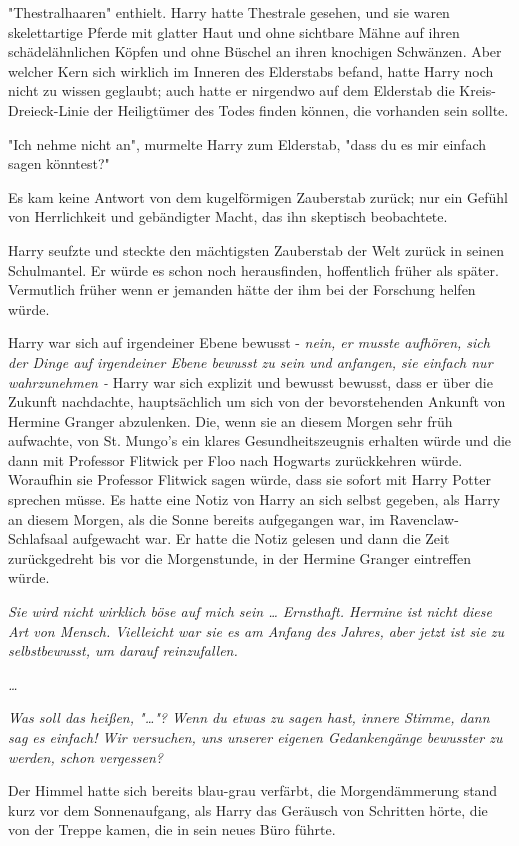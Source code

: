 {"Thestralhaaren" enthielt. Harry hatte Thestrale gesehen, und sie waren skelettartige Pferde mit glatter Haut und ohne sichtbare Mähne auf ihren schädelähnlichen Köpfen und ohne Büschel an ihren knochigen Schwänzen. Aber welcher Kern sich wirklich im Inneren des Elderstabs befand, hatte Harry noch nicht zu wissen geglaubt; auch hatte er nirgendwo auf dem Elderstab die Kreis-Dreieck-Linie der Heiligtümer des Todes finden können, die vorhanden sein sollte.

"Ich nehme nicht an", murmelte Harry zum Elderstab, "dass du es mir einfach sagen könntest?"

Es kam keine Antwort von dem kugelförmigen Zauberstab zurück; nur ein Gefühl von Herrlichkeit und gebändigter Macht, das ihn skeptisch beobachtete.

Harry seufzte und steckte den mächtigsten Zauberstab der Welt zurück in seinen Schulmantel. Er würde es schon noch herausfinden, hoffentlich früher als später. Vermutlich früher wenn er jemanden hätte der ihm bei der Forschung helfen würde.

Harry war sich auf irgendeiner Ebene bewusst - \emph{nein, er musste aufhören, sich der Dinge auf irgendeiner Ebene bewusst zu sein und anfangen, sie einfach nur wahrzunehmen -} Harry war sich explizit und bewusst bewusst, dass er über die Zukunft nachdachte, hauptsächlich um sich von der bevorstehenden Ankunft von Hermine Granger abzulenken. Die, wenn sie an diesem Morgen sehr früh aufwachte, von St. Mungo's ein klares Gesundheitszeugnis erhalten würde und die dann mit Professor Flitwick per Floo nach Hogwarts zurückkehren würde. Woraufhin sie Professor Flitwick sagen würde, dass sie sofort mit Harry Potter sprechen müsse. Es hatte eine Notiz von Harry an sich selbst gegeben, als Harry an diesem Morgen, als die Sonne bereits aufgegangen war, im Ravenclaw-Schlafsaal aufgewacht war. Er hatte die Notiz gelesen und dann die Zeit zurückgedreht bis vor die Morgenstunde, in der Hermine Granger eintreffen würde.

\emph{Sie wird nicht wirklich böse auf mich sein … Ernsthaft. Hermine ist nicht diese Art von Mensch. Vielleicht war sie es am Anfang des Jahres, aber jetzt ist sie zu selbstbewusst, um darauf reinzufallen.}

\emph{…}

\emph{Was soll das heißen, "…"? Wenn du etwas zu sagen hast, innere Stimme, dann sag es einfach! Wir versuchen, uns unserer eigenen Gedankengänge bewusster zu werden, schon vergessen?}

Der Himmel hatte sich bereits blau-grau verfärbt, die Morgendämmerung stand kurz vor dem Sonnenaufgang, als Harry das Geräusch von Schritten hörte, die von der Treppe kamen, die in sein neues Büro führte.

}
